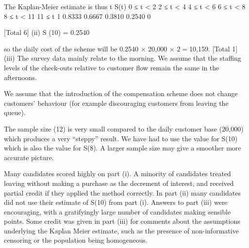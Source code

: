 \documentclass[a4paper,12pt]{article}
\begin{document}
The Kaplan-Meier estimate is thus
t S(t)
0 ≤ t < 2
2 ≤ t < 4
4 ≤ t < 6
6 ≤ t < 8
8 ≤ t < 11
11 ≤ t
 1
0.8333
0.6667
0.3810
0.2540
0


[Total 6]
(ii)
S (10) = 0.2540

so the daily cost of the scheme will be 0.2540 × 20,000 × $2 = $10,159. 
[Total 1]
(iii)
The survey data mainly relate to the morning. We assume that the staffing levels of the check-outs relative to customer flow remain the same in the
afternoons.

We assume that the introduction of the compensation scheme does not change
customers’ behaviour (for example discouraging customers from leaving the queue).

The sample size (12) is very small compared to the daily customer base
(20,000) which produces a very “steppy” result. We have had to use the value for S(10) which is also the value for S(8). A larger sample size may give a
smoother more accurate picture.

\newpage

Many candidates scored highly on part (i). A minority of candidates treated leaving without making a purchase as the decrement of interest, and received partial credit if they applied the method correctly. In part (ii) many candidates
did not use their estimate of S(10) from part (i). Answers to part (iii) were encouraging, with a gratifyingly large number of candidates making sensible
points. Some credit was given in part (iii) for comments about the
assumptions underlying the Kaplan Meier estimate, such as the presence of
non-informative censoring or the population being homogeneous.
\end{document}
